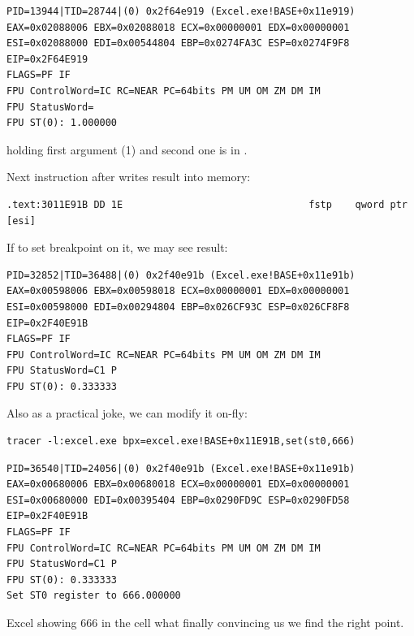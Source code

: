 \begin{lstlisting}
PID=13944|TID=28744|(0) 0x2f64e919 (Excel.exe!BASE+0x11e919)
EAX=0x02088006 EBX=0x02088018 ECX=0x00000001 EDX=0x00000001
ESI=0x02088000 EDI=0x00544804 EBP=0x0274FA3C ESP=0x0274F9F8
EIP=0x2F64E919
FLAGS=PF IF
FPU ControlWord=IC RC=NEAR PC=64bits PM UM OM ZM DM IM 
FPU StatusWord=
FPU ST(0): 1.000000
\end{lstlisting}

{\STZERO holding first argument (1) and second one is in} \TT{[ebx]}.

{Next instruction after \FDIV writes result into memory:}

\begin{lstlisting}
.text:3011E91B DD 1E                                fstp    qword ptr [esi]
\end{lstlisting}

{If to set breakpoint on it, we may see result:}

\begin{lstlisting}
PID=32852|TID=36488|(0) 0x2f40e91b (Excel.exe!BASE+0x11e91b)
EAX=0x00598006 EBX=0x00598018 ECX=0x00000001 EDX=0x00000001
ESI=0x00598000 EDI=0x00294804 EBP=0x026CF93C ESP=0x026CF8F8
EIP=0x2F40E91B
FLAGS=PF IF
FPU ControlWord=IC RC=NEAR PC=64bits PM UM OM ZM DM IM 
FPU StatusWord=C1 P 
FPU ST(0): 0.333333
\end{lstlisting}

{Also as a practical joke, we can modify it on-fly:}

\begin{lstlisting}
tracer -l:excel.exe bpx=excel.exe!BASE+0x11E91B,set(st0,666)
\end{lstlisting}

\begin{lstlisting}
PID=36540|TID=24056|(0) 0x2f40e91b (Excel.exe!BASE+0x11e91b)
EAX=0x00680006 EBX=0x00680018 ECX=0x00000001 EDX=0x00000001
ESI=0x00680000 EDI=0x00395404 EBP=0x0290FD9C ESP=0x0290FD58
EIP=0x2F40E91B
FLAGS=PF IF
FPU ControlWord=IC RC=NEAR PC=64bits PM UM OM ZM DM IM 
FPU StatusWord=C1 P 
FPU ST(0): 0.333333
Set ST0 register to 666.000000
\end{lstlisting}

{Excel showing $666$ in the cell what finally convincing us we find the right point.}


